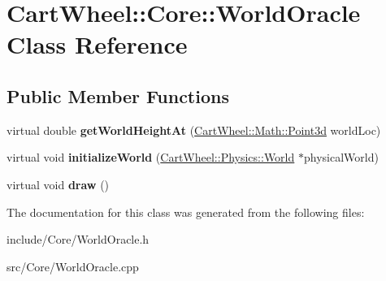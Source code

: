 \hypertarget{classCartWheel_1_1Core_1_1WorldOracle}{
\section{CartWheel::Core::WorldOracle Class Reference}
\label{classCartWheel_1_1Core_1_1WorldOracle}
}
\subsection*{Public Member Functions}
\begin{DoxyCompactItemize}
\item 
\hypertarget{classCartWheel_1_1Core_1_1WorldOracle_a2f99ec955a5ab4c90b2f552d13cfa751}{
virtual double {\bfseries getWorldHeightAt} (\hyperlink{classCartWheel_1_1Math_1_1Point3d}{CartWheel::Math::Point3d} worldLoc)}
\label{classCartWheel_1_1Core_1_1WorldOracle_a2f99ec955a5ab4c90b2f552d13cfa751}

\item 
\hypertarget{classCartWheel_1_1Core_1_1WorldOracle_a7632e030a1bcb84431781cdd9a1ae612}{
virtual void {\bfseries initializeWorld} (\hyperlink{classCartWheel_1_1Physics_1_1World}{CartWheel::Physics::World} $\ast$physicalWorld)}
\label{classCartWheel_1_1Core_1_1WorldOracle_a7632e030a1bcb84431781cdd9a1ae612}

\item 
\hypertarget{classCartWheel_1_1Core_1_1WorldOracle_a28fb7ebbf1ac93ffe2158a4cf150079c}{
virtual void {\bfseries draw} ()}
\label{classCartWheel_1_1Core_1_1WorldOracle_a28fb7ebbf1ac93ffe2158a4cf150079c}

\end{DoxyCompactItemize}


The documentation for this class was generated from the following files:\begin{DoxyCompactItemize}
\item 
include/Core/WorldOracle.h\item 
src/Core/WorldOracle.cpp\end{DoxyCompactItemize}
